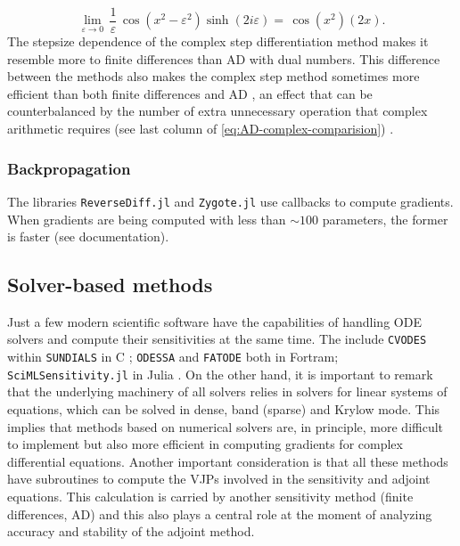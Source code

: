 \begin{equation}
    \lim_{\varepsilon \rightarrow 0} \, \frac{1}{\varepsilon} \, \cos(x^2 - \varepsilon^2) \sinh (2i\varepsilon) 
    = 
    \, \cos(x^2) (2x).
\end{equation}
The stepsize dependence of the complex step differentiation method makes it resemble more to finite differences than AD with dual numbers. 
This difference between the methods also makes the complex step method sometimes more efficient than both finite differences and AD \cite{Lantoine_Russell_Dargent_2012}, an effect that can be counterbalanced by the number of extra unnecessary operation that complex arithmetic requires (see last column of \eqref{eq:AD-complex-comparision}) \cite{Martins_Sturdza_Alonso_2003_complex_differentiation}.

\subsubsection{Backpropagation}

The libraries \texttt{ReverseDiff.jl} and \texttt{Zygote.jl} use callbacks to compute gradients. When gradients are being computed with less than $\sim 100$ parameters, the former is faster (see documentation).

\subsection{Solver-based methods}

Just a few modern scientific software have the capabilities of handling ODE solvers and compute their sensitivities at the same time. 
The include \texttt{CVODES} within \texttt{SUNDIALS} in C \cite{serban2005cvodes, SUNDIALS-hindmarsh2005sundials}; \texttt{ODESSA}\cite{ODESSA} and \texttt{FATODE} \cite{FATODE2014} both in Fortram; \texttt{SciMLSensitivity.jl} in Julia \cite{rackauckas2020universal}.
On the other hand, it is important to remark that the underlying machinery of all solvers relies in solvers for linear systems of equations, which can be solved in dense, band (sparse) and Krylow mode. 
This implies that methods based on numerical solvers are, in principle, more difficult to implement but also more efficient in computing gradients for complex differential equations. 
Another important consideration is that all these methods have subroutines to compute the VJPs involved in the sensitivity and adjoint equations. 
This calculation is carried by another sensitivity method (finite differences, AD) and this also plays a central role at the moment of analyzing accuracy and stability of the adjoint method. 

